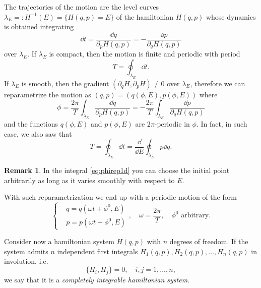 \documentclass[english,fontsize=11pt,paper=b5]{scrbook}
\theoremstyle{definition}
\newtheorem{remark}{Remark}[chapter]
\begin{document}
      The trajectories of the motion are the level curves $\lambda_E =: H^{-1}(E) = \{H(q,p) = E\}$ of the hamiltonian $H(q,p)$ whose dynamics is obtained integrating
      \begin{equation}
        \dd t = \frac{\dd q}{\partial_p H(q,p)} = - \frac{\dd p}{\partial_q H(q,p)}
      \end{equation}
      over $\lambda_E$.
      If $\lambda_E$ is compact, then the motion is finite and periodic with period
      \begin{equation}
        T = \oint_{\lambda_E}\dd t.
      \end{equation}
      If $\lambda_E$ is smooth, then the gradient $(\partial_q H, \partial_p H)\neq 0$ over $\lambda_E$, therefore we can reparametrize the motion as $(q,p) = (q(\phi, E), p(\phi, E))$ where
      \begin{equation}\label{eq:phirep1d}
        \phi = \frac{2\pi}{T}\int_{\lambda_E} \frac{\dd q}{\partial_p H(q,p)} = -\frac{2\pi}{T}\int_{\lambda_E} \frac{\dd p}{\partial_q H(q,p)}
      \end{equation}
      and the functions $q(\phi, E)$ and $p(\phi, E)$ are $2\pi$-periodic in $\phi$.
      In fact, in such case, we also saw that
      \begin{equation}
        T = \oint_{\lambda_E}\dd t = \frac{\dd}{\dd E} \oint_{\lambda_E} p\dd q.
      \end{equation}

      \begin{remark}
        In the integral \eqref{eq:phirep1d} you can choose the initial point arbitrarily as long as it varies smoothly with respect to $E$.
      \end{remark}

      With such reparametrization we end up with a periodic motion of the form
      \begin{equation}
        \left\lbrace
          \begin{aligned}
     & q = q\left(\omega t + \phi^0, E\right) \\
     & p = p\left(\omega t + \phi^0, E\right)
          \end{aligned}
        \right., \quad \omega = \frac{2\pi}{T}, \quad \phi^0\mbox{ arbitrary}.
      \end{equation}

      \begin{tcolorbox}
        Consider now a hamiltonian system $H(q,p)$ with $n$ degrees of freedom.
        If the system admits $n$ independent first integrals $H_1(q,p), H_2(q,p), \ldots, H_n(q,p)$ in involution, i.e.
        \begin{equation}
          \big\{H_i, H_j\big\} = 0,\quad i,j=1,\ldots,n,
        \end{equation}
        we say that it is a \emph{completely integrable hamiltonian system}.
      \end{tcolorbox}
\end{document}
